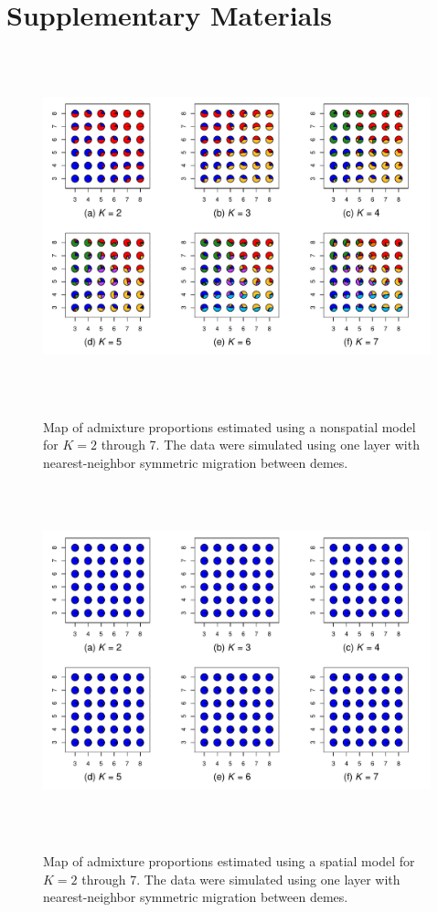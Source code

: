 \documentclass[12pt]{article}
\begin{document}
\section*{Supplementary Materials}
\renewcommand{\theequation}{S\arabic{equation}}
\setcounter{equation}{0}
\renewcommand{\thetable}{S\arabic{table}}
\setcounter{table}{0}
\renewcommand{\thefigure}{S\arabic{figure}}
\setcounter{figure}{0}

\newpage
\begin{figure}
	\centering
		{\includegraphics[width=6in,height=4in]{figs/sims/simK1_nsp_pies.pdf}}
	\caption{
	Map of admixture proportions estimated using a nonspatial model for $K=2$ through 7.
	The data were simulated using one layer with nearest-neighbor symmetric migration between demes.
    }\label{simK1_nsp_pies}
\end{figure}

\begin{figure}
	\centering
		{\includegraphics[width=6in,height=4in]{figs/sims/simK1_sp_pies.pdf}}
	\caption{
	Map of admixture proportions estimated using a spatial model for $K=2$ through 7.
	The data were simulated using one layer with nearest-neighbor symmetric migration between demes.
    }\label{simK1_sp_pies}
\end{figure}
\end{document}
